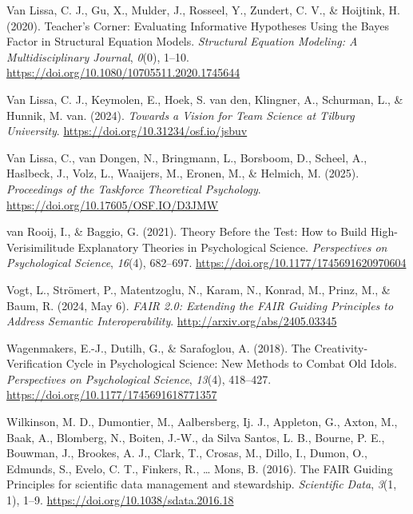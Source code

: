 \documentclass[
  man, noextraspace,floatsintext]{apa7}
\newlength{\cslhangindent}
\newenvironment{CSLReferences}[2] %
 {\begin{list}{}{%
  \setlength{\itemindent}{0pt}
  \setlength{\leftmargin}{0pt}
  \setlength{\parsep}{0pt}
  \ifodd #1
   \setlength{\leftmargin}{\cslhangindent}
   \setlength{\itemindent}{-1\cslhangindent}
  \fi
  \setlength{\itemsep}{#2\baselineskip}}}
 {\end{list}}
\begin{document}
\begin{CSLReferences}{1}{0}
Van Lissa, C. J., Gu, X., Mulder, J., Rosseel, Y., Zundert, C. V., \& Hoijtink, H. (2020). Teacher's {Corner}: {Evaluating Informative Hypotheses Using} the {Bayes Factor} in {Structural Equation Models}. \emph{Structural Equation Modeling: A Multidisciplinary Journal}, \emph{0}(0), 1--10. \url{https://doi.org/10.1080/10705511.2020.1745644}

Van Lissa, C. J., Keymolen, E., Hoek, S. van den, Klingner, A., Schurman, L., \& Hunnik, M. van. (2024). \emph{Towards a {Vision} for {Team Science} at {Tilburg University}}. \url{https://doi.org/10.31234/osf.io/jsbuv}

Van Lissa, C., van Dongen, N., Bringmann, L., Borsboom, D., Scheel, A., Haslbeck, J., Volz, L., Waaijers, M., Eronen, M., \& Helmich, M. (2025). \emph{Proceedings of the {Taskforce Theoretical Psychology}}. \url{https://doi.org/10.17605/OSF.IO/D3JMW}

van Rooij, I., \& Baggio, G. (2021). Theory {Before} the {Test}: {How} to {Build High-Verisimilitude Explanatory Theories} in {Psychological Science}. \emph{Perspectives on Psychological Science}, \emph{16}(4), 682--697. \url{https://doi.org/10.1177/1745691620970604}

Vogt, L., Strömert, P., Matentzoglu, N., Karam, N., Konrad, M., Prinz, M., \& Baum, R. (2024, May 6). \emph{{FAIR} 2.0: {Extending} the {FAIR Guiding Principles} to {Address Semantic Interoperability}}. \url{http://arxiv.org/abs/2405.03345}

Wagenmakers, E.-J., Dutilh, G., \& Sarafoglou, A. (2018). The {Creativity-Verification Cycle} in {Psychological Science}: {New Methods} to {Combat Old Idols}. \emph{Perspectives on Psychological Science}, \emph{13}(4), 418--427. \url{https://doi.org/10.1177/1745691618771357}

Wilkinson, M. D., Dumontier, M., Aalbersberg, Ij. J., Appleton, G., Axton, M., Baak, A., Blomberg, N., Boiten, J.-W., da Silva Santos, L. B., Bourne, P. E., Bouwman, J., Brookes, A. J., Clark, T., Crosas, M., Dillo, I., Dumon, O., Edmunds, S., Evelo, C. T., Finkers, R., \ldots{} Mons, B. (2016). The {FAIR Guiding Principles} for scientific data management and stewardship. \emph{Scientific Data}, \emph{3}(1, 1), 1--9. \url{https://doi.org/10.1038/sdata.2016.18}


\end{CSLReferences}
\end{document}

